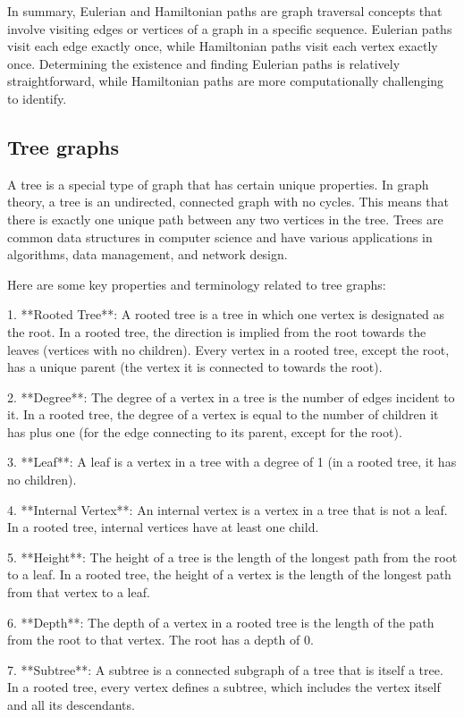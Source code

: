 \documentclass{article}
\begin{document}
In summary, Eulerian and Hamiltonian paths are graph traversal concepts that involve visiting edges or vertices of a graph in a specific sequence. Eulerian paths visit each edge exactly once, while Hamiltonian paths visit each vertex exactly once. Determining the existence and finding Eulerian paths is relatively straightforward, while Hamiltonian paths are more computationally challenging to identify.


\subsection{Tree graphs}

A tree is a special type of graph that has certain unique properties. In graph theory, a tree is an undirected, connected graph with no cycles. This means that there is exactly one unique path between any two vertices in the tree. Trees are common data structures in computer science and have various applications in algorithms, data management, and network design.

Here are some key properties and terminology related to tree graphs:

1. **Rooted Tree**: A rooted tree is a tree in which one vertex is designated as the root. In a rooted tree, the direction is implied from the root towards the leaves (vertices with no children). Every vertex in a rooted tree, except the root, has a unique parent (the vertex it is connected to towards the root).

2. **Degree**: The degree of a vertex in a tree is the number of edges incident to it. In a rooted tree, the degree of a vertex is equal to the number of children it has plus one (for the edge connecting to its parent, except for the root).

3. **Leaf**: A leaf is a vertex in a tree with a degree of 1 (in a rooted tree, it has no children).

4. **Internal Vertex**: An internal vertex is a vertex in a tree that is not a leaf. In a rooted tree, internal vertices have at least one child.

5. **Height**: The height of a tree is the length of the longest path from the root to a leaf. In a rooted tree, the height of a vertex is the length of the longest path from that vertex to a leaf.

6. **Depth**: The depth of a vertex in a rooted tree is the length of the path from the root to that vertex. The root has a depth of 0.

7. **Subtree**: A subtree is a connected subgraph of a tree that is itself a tree. In a rooted tree, every vertex defines a subtree, which includes the vertex itself and all its descendants.
\end{document}
